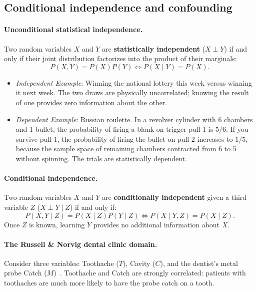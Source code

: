 \subsection{Conditional independence and confounding}
\label{sec:independence_and_confounding}

\paragraph{Unconditional statistical independence.}
Two random variables $X$ and $Y$ are \textbf{statistically independent} ($X \perp Y$) if and only if their joint distribution factorizes into the product of their marginals:
\begin{equation}
P(X, Y) = P(X) P(Y) \iff P(X \mid Y) = P(X).
\label{eq:unconditional_independence}
\end{equation}
\begin{itemize}[noitemsep]
  \item \emph{Independent Example}: Winning the national lottery this week versus winning it next week. The two draws are physically uncorrelated; knowing the result of one provides zero information about the other.
  \item \emph{Dependent Example}: Russian roulette. In a revolver cylinder with 6 chambers and 1 bullet, the probability of firing a blank on trigger pull 1 is $5/6$. If you survive pull 1, the probability of firing the bullet on pull 2 increases to $1/5$, because the sample space of remaining chambers contracted from 6 to 5 without spinning. The trials are statistically dependent.
\end{itemize}

\paragraph{Conditional independence.}
Two random variables $X$ and $Y$ are \textbf{conditionally independent} given a third variable $Z$ ($X \perp Y \mid Z$) if and only if:
\begin{equation}
P(X, Y \mid Z) = P(X \mid Z) P(Y \mid Z) \iff P(X \mid Y, Z) = P(X \mid Z).
\label{eq:conditional_independence_def}
\end{equation}
Once $Z$ is known, learning $Y$ provides no additional information about $X$.

\paragraph{The Russell \& Norvig dental clinic domain.}
Consider three variables: Toothache ($T$), Cavity ($C$), and the dentist's metal probe Catch ($M$)~\cite{russell2020artificial}. Toothache and Catch are strongly correlated: patients with toothaches are much more likely to have the probe catch on a tooth. 

